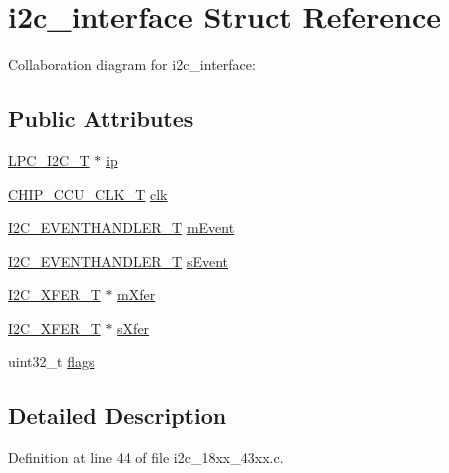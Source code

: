 \hypertarget{structi2c__interface}{}\section{i2c\+\_\+interface Struct Reference}
\label{structi2c__interface}


Collaboration diagram for i2c\+\_\+interface\+:
\subsection*{Public Attributes}
\begin{DoxyCompactItemize}
\item 
\hyperlink{struct_l_p_c___i2_c___t}{L\+P\+C\+\_\+\+I2\+C\+\_\+T} $\ast$ \hyperlink{structi2c__interface_a3081afc519201026e2c06217a5c71eef}{ip}
\item 
\hyperlink{chip__clocks_8h_a45bb23228b9831321626c103ada7c60b}{C\+H\+I\+P\+\_\+\+C\+C\+U\+\_\+\+C\+L\+K\+\_\+T} \hyperlink{structi2c__interface_a52b6100bed4c931d75dc6272692f053f}{clk}
\item 
\hyperlink{group___i2_c__18_x_x__43_x_x_gaef152f4dc1487d90573810007489082e}{I2\+C\+\_\+\+E\+V\+E\+N\+T\+H\+A\+N\+D\+L\+E\+R\+\_\+T} \hyperlink{structi2c__interface_ac9762dcaee633a0121320763422eabdf}{m\+Event}
\item 
\hyperlink{group___i2_c__18_x_x__43_x_x_gaef152f4dc1487d90573810007489082e}{I2\+C\+\_\+\+E\+V\+E\+N\+T\+H\+A\+N\+D\+L\+E\+R\+\_\+T} \hyperlink{structi2c__interface_aa0820cc1e59b1da898435b4813f5c58d}{s\+Event}
\item 
\hyperlink{struct_i2_c___x_f_e_r___t}{I2\+C\+\_\+\+X\+F\+E\+R\+\_\+T} $\ast$ \hyperlink{structi2c__interface_a8894534cc883275b847f183e6fe1e7e6}{m\+Xfer}
\item 
\hyperlink{struct_i2_c___x_f_e_r___t}{I2\+C\+\_\+\+X\+F\+E\+R\+\_\+T} $\ast$ \hyperlink{structi2c__interface_a891a1ea53436714c117aaa2d0917e9f2}{s\+Xfer}
\item 
uint32\+\_\+t \hyperlink{structi2c__interface_a8b1e70d8de79970bd3e61e67e59e15a2}{flags}
\end{DoxyCompactItemize}


\subsection{Detailed Description}


Definition at line 44 of file i2c\+\_\+18xx\+\_\+43xx.\+c.



